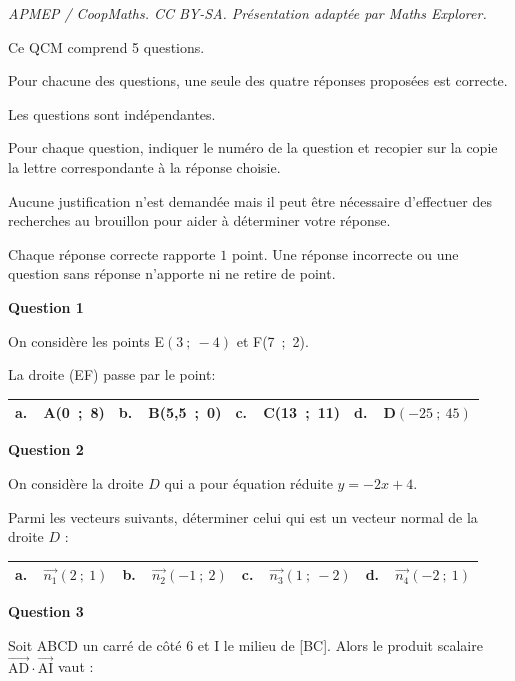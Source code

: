 \documentclass[10pt]{article}
\providecommand{\vect}[1]{\overrightarrow{#1}}
\begin{document}
\noindent\textit{APMEP / CoopMaths. CC BY-SA. Présentation adaptée par Maths Explorer.}\par\medskip
\medskip

Ce QCM comprend 5 questions.

Pour chacune des questions, une seule des quatre réponses proposées est correcte.

Les questions sont indépendantes.

Pour chaque question, indiquer le numéro de la question et recopier sur la copie la lettre correspondante à la réponse choisie.

Aucune justification n'est demandée mais il peut être nécessaire d'effectuer des recherches au brouillon pour aider à déterminer votre réponse.

Chaque réponse correcte rapporte $1$ point. Une réponse incorrecte ou une question sans réponse n'apporte ni ne retire de point.

\medskip

\textbf{Question 1} 

On considère les points E$(3~;~-4)$ et F(7~;~2).

La droite (EF) passe par le point:

\begin{center}
\begin{tabularx}{\linewidth}{|*{4}{X|}}\hline
\textbf{a.~~}A(0~;~8)&\textbf{b.~~}B(5,5~;~0)&\textbf{c.~~}C(13~;~11)&\textbf{d.~~}D$(-25~;~45)$\\ \hline
\end{tabularx}
\end{center}


\textbf{Question 2}

On considère la droite $D$ qui a pour équation réduite $y = - 2x + 4$.

Parmi les vecteurs suivants, déterminer celui qui est un vecteur normal de la droite $D$ :

\begin{center}
\begin{tabularx}{\linewidth}{|*{4}{X|}}\hline
\textbf{a.~~}$\vect{n_1}(2~;~1)$\rule{0pt}{12pt}&\textbf{b.~~}$\vect{n_2}(-1~;~2)$&\textbf{c.~~}$\vect{n_3}(1~;~-2)$&\textbf{d.~~}$\vect{n_4}(-2~;~1)$\\ \hline
\end{tabularx}
\end{center}

\textbf{Question 3}

Soit ABCD un carré de côté 6 et I le milieu de [BC]. Alors le produit scalaire $\vect{\text{AD}} \cdot \vect{\text{AI}}$ vaut :
\end{document}
